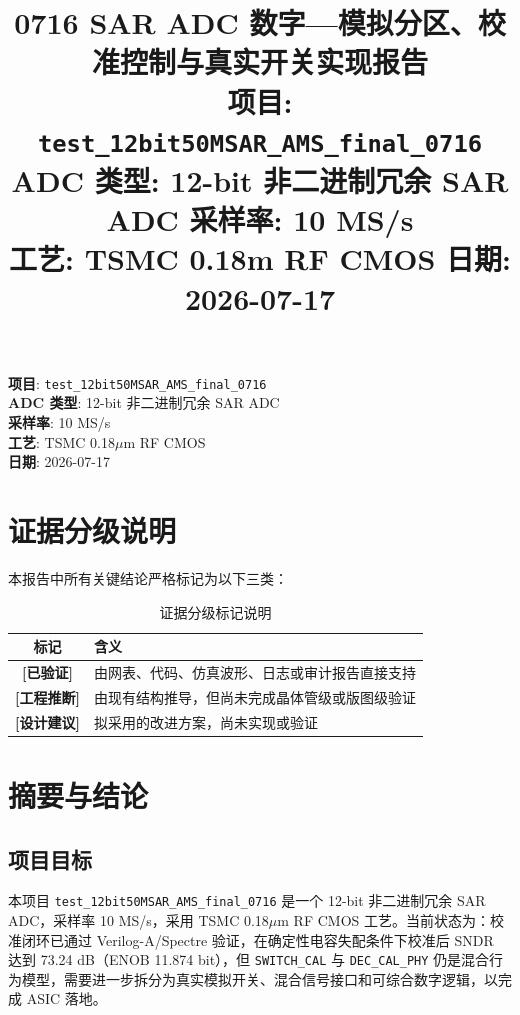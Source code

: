 \documentclass[UTF8,a4paper,11pt]{ctexart}
\title{\textbf{0716 SAR ADC 数字—模拟分区、校准控制与真实开关实现报告}\\[4pt]
\large \textnormal{项目: \texttt{test\_12bit50MSAR\_AMS\_final\_0716}}\\[2pt]
\textnormal{ADC 类型: 12-bit 非二进制冗余 SAR ADC \quad 采样率: 10 MS/s}\\[2pt]
\textnormal{工艺: TSMC 0.18\textmu m RF CMOS \quad 日期: 2026-07-17}}
\author{}
\date{}
\newcommand{\verified}{\textcolor{verifiedgreen}{\textbf{[已验证]}}}
\newcommand{\inferred}{\textcolor{inferorange}{\textbf{[工程推断]}}}
\newcommand{\suggested}{\textcolor{suggestblue}{\textbf{[设计建议]}}}
\providecommand{\textmu}{\ensuremath{\mu}}
\begin{document}
\maketitle
\thispagestyle{fancy}

\begin{infobox}
\textbf{项目}: \texttt{test\_12bit50MSAR\_AMS\_final\_0716}\\
\textbf{ADC 类型}: 12-bit 非二进制冗余 SAR ADC\\
\textbf{采样率}: 10 MS/s\\
\textbf{工艺}: TSMC 0.18\textmu m RF CMOS\\
\textbf{日期}: 2026-07-17
\end{infobox}

\tableofcontents
\newpage

\section{证据分级说明}

本报告中所有关键结论严格标记为以下三类：

\begin{table}[H]
\centering
\caption{证据分级标记说明}
\label{tab:evidence-grade}
\begin{tabular}{cl}
\toprule
标记 & 含义 \\
\midrule
\verified & 由网表、代码、仿真波形、日志或审计报告直接支持 \\
\inferred & 由现有结构推导，但尚未完成晶体管级或版图级验证 \\
\suggested & 拟采用的改进方案，尚未实现或验证 \\
\bottomrule
\end{tabular}
\end{table}

\section{摘要与结论}

\subsection{项目目标}

本项目 \texttt{test\_12bit50MSAR\_AMS\_final\_0716} 是一个 12-bit 非二进制冗余 SAR ADC，采样率 10 MS/s，采用 TSMC 0.18\textmu m RF CMOS 工艺。当前状态为：校准闭环已通过 Verilog-A/Spectre 验证，在确定性电容失配条件下校准后 SNDR 达到 73.24 dB（ENOB 11.874 bit），但 \texttt{SWITCH\_CAL} 与 \texttt{DEC\_CAL\_PHY} 仍是混合行为模型，需要进一步拆分为真实模拟开关、混合信号接口和可综合数字逻辑，以完成 ASIC 落地。
\end{document}
